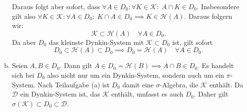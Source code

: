 \documentclass{article}
\begin{document}
\begin{enumerate}[(a)]
        Daraus folgt aber sofort, dass $\forall A \in D_0\colon\forall K\in \mathcal{K}\colon\; A \cap K \in D_0$. Insbesondere gilt also $\forall K \in \mathcal{K}\colon \forall A \in D_0\colon\; K \cap A \in D_0 \implies K \in \mathcal{H}(A)$. Daraus folgern wir:
        \[
            \mathcal{K} \subset \mathcal{H}(A)\quad \forall A \in D_0.
        \]
        Da aber $D_0$ das kleinste Dynkin-System mit $\mathcal{K} \subset D_0$ ist, gilt sofort \[D_0 \subset \mathcal{H}(A) \subset D_0 \implies D_0 = \mathcal{H}(A)\quad  \forall A\in D_0.\]
        \item Seien $A, B\in D_0$. Dann gilt $A \in D_0 = \mathcal{H}(B) \implies A\cap B \in D_0$. Es handelt sich bei $D_0$ also nicht nur um ein Dynkin-System, sondern auch um ein $\pi$-System. Nach Teilaufgabe (a) ist $D_0$ damit eine $\sigma$-Algebra, die $\mathcal{K}$ enthält. Da $\mathcal{D}$ ein Dynkin-System ist, das $\mathcal{K}$ enthält, umfasst es auch $D_0$. Daher gilt $\sigma(\mathcal{K}) \subset D_0 \subset \mathcal{D}$.
    \end{enumerate}
\end{document}

